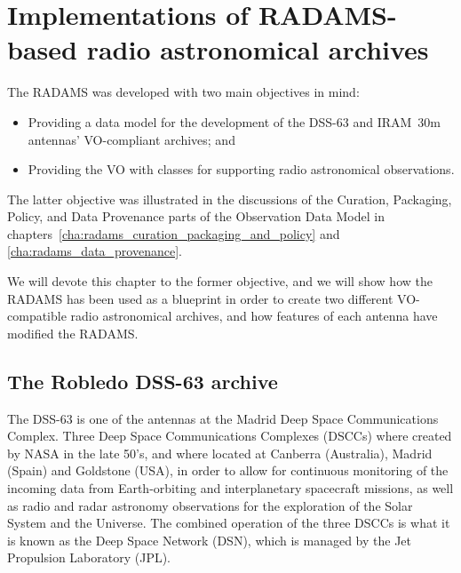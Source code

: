 \chapter[Implementations of RADAMS-based radio astronomical archives][RADAMS-based astronomical archives]{Implementations of RADAMS-based radio astronomical archives}
\label{cha:radams_based_archives}
	
	The RADAMS was developed with two main objectives in mind:
	
	\begin{itemize}
		\item Providing a data model for the development of 
		the DSS-63 and IRAM~30m antennas' VO-compliant archives; and
		
		\item Providing the VO with classes for supporting
		radio astronomical observations.
	\end{itemize}
	
	The latter objective was illustrated in the discussions
	of the Curation, Packaging, Policy, and Data Provenance
	parts of the Observation Data Model in
	chapters~\ref{cha:radams_curation_packaging_and_policy} and
	\ref{cha:radams_data_provenance}.
	
	We will devote this chapter to the former objective, and we will
	show how the RADAMS has been used as a blueprint in order to
	create two different VO-compatible radio astronomical archives,
	and how features of each antenna have modified the RADAMS.
	
	\section{The Robledo DSS-63 archive} %
	\label{sec:the_robledo_dss_63_archive}
		
		The DSS-63 is one of the antennas at the Madrid Deep Space
		Communications Complex. Three Deep Space Communications
		Complexes (DSCCs) where created by NASA in the late 50’s,
		and where located at Canberra (Australia), Madrid (Spain)
		and Goldstone (USA), in order to allow for continuous
		monitoring of the incoming data from Earth-orbiting and
		interplanetary spacecraft missions, as well as radio and
		radar astronomy observations for the exploration of the
		Solar System and the Universe. The combined operation of
		the three DSCCs is what it is known as the Deep Space
		Network (DSN), which is managed by the Jet Propulsion
		Laboratory (JPL).
		
